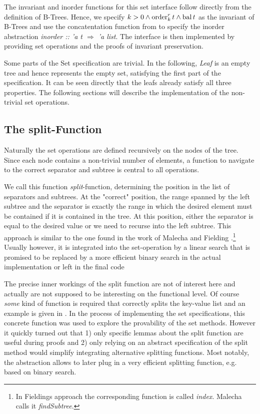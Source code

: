 The invariant and inorder functions for this set interface
follow directly from the definition of B-Trees.
Hence, we specify $k > 0 \wedge \operatorname{order}^r_k t \wedge \operatorname{bal} t$
as the invariant of B-Trees and use
the concatentation function from  to specify the
inorder abstraction \textit{inorder :: 'a t $\Rightarrow$ 'a list}.
The interface is then implemented by providing set operations
and the proofs of invariant preservation.

Some parts of the Set specification are trivial.
In the following, \textit{Leaf} is an empty tree and hence represents
the empty set, satisfying the first part of the specification.
It can be seen directly that the leafs already satisfy all three properties.
The following sections will describe the implementation of the
non-trivial set operations.

\subsection{The split-Function}

Naturally the set operations are defined recursively on the nodes of the tree.
Since each node contains a non-trivial number of elements,
a function to navigate to the correct separator and subtree is central to all operations.

We call this function \textit{split}-function,
determining the position in the list of separators and subtrees.
At the "correct" position, the range spanned by the left subtree
and the separator is exactly the range in which the desired element
must be contained if it is contained in the tree.
At this position, either the separator is equal to the desired value or
we need to recurse into the left subtree.
This approach is similar to the one found in the work of Malecha and Fielding \parencite{DBLP:conf/popl/MalechaMSW10,Fielding80}.\footnote{
    In Fieldings approach the corresponding function is called \textit{index}.
    Malecha calls it \textit{findSubtree}.
}
Usually however, it is integrated into the set-operation
by a linear search that is promised to be replaced by a more efficient binary search
in the actual implementation \parencite{DBLP:books/daglib/0023376,DBLP:journals/acta/BayerM72}
or left in the final code \parencite{DBLP:journals/sosym/ErnstSR15}

The precise inner workings of the split function are not of interest here
and actually are not supposed to be interesting on the functional level.
Of course \textit{some} kind of function is required that correctly splits
the key-value list and an example is given in .
In the process of implementing the set specifications,
this concrete function was used to explore the provability of the set methods.
However it quickly turned out that 1) only specific lemmas about the split
function are useful during proofs and 2) only relying on an abstract specification of
the split method would simplify integrating alternative splitting functions.
Most notably, the abstraction allows to later plug in a very efficient splitting
function, e.g. based on binary search.

